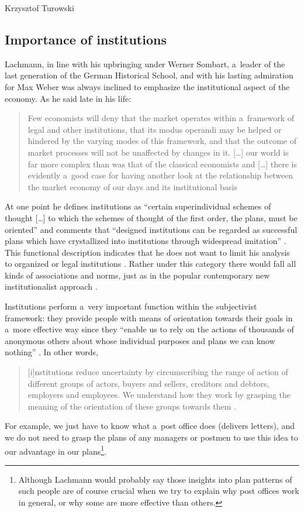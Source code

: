 \begin{artengenv}{Krzysztof Turowski}
\subsection{Importance of institutions}


Lachmann, in line with his upbringing under Werner Sombart, a~leader of the last generation of the German Historical School, and with his lasting admiration for Max Weber was always inclined to emphasize the institutional aspect of the economy. As he said late in his life:
\begin{quote}
Few economists will deny that the market operates within a~framework of legal and other institutions, that its modus operandi may be helped or hindered by the varying modes of this framework, and that the outcome of market processes will not be unaffected by changes in it. [\ldots] our world is far more complex than was that of the classical economists and [\ldots] there is evidently a~good case for having another look at the relationship between the market economy of our days and its institutional basis \parencite[249--250]{lachmann-legislation}
\end{quote}
At one point he defines institutions as ``certain superindividual schemes of thought [\ldots] to which the schemes of thought of the first order, the plans, must be oriented'' \parencite[62]{lachmann-significance} and comments that ``designed institutions can be regarded as successful plans which have crystallized into institutions through widespread imitation'' \parencite[81, 89]{lachmann-mises-process}.
This functional description indicates that he does not want to limit his analysis to organized or legal institutions \parencite[62--63]{lachmann-weber}. Rather under this category there would fall all kinds of associations and norms, just as in the popular contemporary new institutionalist approach \parencite[7--8]{alvesson}.

Institutions perform a~very important function within the subjectivist framework: they provide people with means of orientation towards their goals in a~more effective way since they ``enable us to rely on the actions of thousands of anonymous others about whose individual purposes and plans we can know nothing'' \parencite[49--50]{lachmann-weber}. In other words,
\begin{quote}
[i]nstitutions reduce uncertainty by circumscribing the range of action of different groups of actors, buyers and sellers, creditors and debtors, employers and employees. We understand how they work by grasping the meaning of the orientation of these groups towards them \parencite[277]{lachmann-hermeneutic}.
\end{quote}
For example, we just have to know what a~post office does (delivers letters), and we do not need to grasp the plans of any managers or postmen to use this idea to our advantage in our plans\footnote{Although Lachmann would probably say those insights into plan patterns of such people are of course crucial when we try to explain why post offices work in general, or why some are more effective than others.}.


\end{artengenv}
